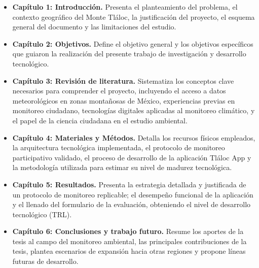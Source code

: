 \begin{itemize}
    \item \textbf{Capítulo 1: Introducción.} Presenta el planteamiento del problema, el contexto geográfico del Monte Tláloc, la justificación del proyecto, el esquema general del documento y las limitaciones del estudio.
    
    \item \textbf{Capítulo 2: Objetivos.} Define el objetivo general y los objetivos específicos que guiaron la realización del presente trabajo de investigación y desarrollo tecnológico.
    
    \item \textbf{Capítulo 3: Revisión de literatura.} Sistematiza los conceptos clave necesarios para comprender el proyecto, incluyendo el acceso a datos meteorológicos en zonas montañosas de México, experiencias previas en monitoreo ciudadano, tecnologías digitales aplicadas al monitoreo climático, y el papel de la ciencia ciudadana en el estudio ambiental.
    
    \item \textbf{Capítulo 4: Materiales y Métodos.} Detalla los recursos físicos empleados, la arquitectura tecnológica implementada, el protocolo de monitoreo participativo validado, el proceso de desarrollo de la aplicación Tláloc App y la metodología utilizada para estimar su nivel de madurez tecnológica.
    
    \item \textbf{Capítulo 5: Resultados.} Presenta la estrategia detallada y justificada de un protocolo de monitoreo replicable; el desempeño funcional de la aplicación y el llenado del formulario de la evaluación, obteniendo el nivel de desarrollo tecnológico (TRL).
    
    \item \textbf{Capítulo 6: Conclusiones y trabajo futuro.} Resume los aportes de la tesis al campo del monitoreo ambiental, las principales contribuciones de la tesis, plantea escenarios de expansión hacia otras regiones y propone líneas futuras de desarrollo.
\end{itemize}


